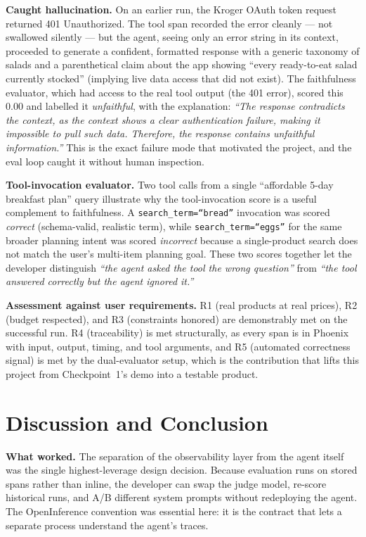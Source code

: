 \documentclass{article}
\begin{document}
\textbf{Caught hallucination.} On an earlier run, the Kroger OAuth token request returned 401 Unauthorized. The tool span recorded the error cleanly --- not swallowed silently --- but the agent, seeing only an error string in its context, proceeded to generate a confident, formatted response with a generic taxonomy of salads and a parenthetical claim about the app showing ``every ready-to-eat salad currently stocked'' (implying live data access that did not exist). The faithfulness evaluator, which had access to the real tool output (the 401 error), scored this $\mathbf{0.00}$ and labelled it \emph{unfaithful}, with the explanation: \emph{``The response contradicts the context, as the context shows a clear authentication failure, making it impossible to pull such data. Therefore, the response contains unfaithful information.''} This is the exact failure mode that motivated the project, and the eval loop caught it without human inspection.

\textbf{Tool-invocation evaluator.} Two tool calls from a single ``affordable 5-day breakfast plan'' query illustrate why the tool-invocation score is a useful complement to faithfulness. A \texttt{search\_term=``bread''} invocation was scored \emph{correct} (schema-valid, realistic term), while \texttt{search\_term=``eggs''} for the same broader planning intent was scored \emph{incorrect} because a single-product search does not match the user's multi-item planning goal. These two scores together let the developer distinguish \emph{``the agent asked the tool the wrong question''} from \emph{``the tool answered correctly but the agent ignored it.''}

\textbf{Assessment against user requirements.} R1 (real products at real prices), R2 (budget respected), and R3 (constraints honored) are demonstrably met on the successful run. R4 (traceability) is met structurally, as every span is in Phoenix with input, output, timing, and tool arguments, and R5 (automated correctness signal) is met by the dual-evaluator setup, which is the contribution that lifts this project from Checkpoint~1's demo into a testable product.

\section{Discussion and Conclusion}

\textbf{What worked.} The separation of the observability layer from the agent itself was the single highest-leverage design decision. Because evaluation runs on stored spans rather than inline, the developer can swap the judge model, re-score historical runs, and A/B different system prompts without redeploying the agent. The OpenInference convention was essential here: it is the contract that lets a separate process understand the agent's traces.
\end{document}

